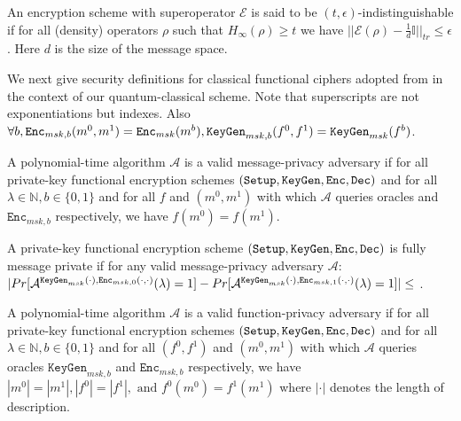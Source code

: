 \begin{definition}
\label{def:ent-ind}
An encryption scheme with superoperator $\mathcal{E}$ is said to be $(t,\epsilon)$-indistinguishable if for all (density) operators $\rho$ such that $H_\infty(\rho) \geq t$ we have 
$ \lvert\lvert \mathcal{E}(\rho) - \frac{1}{d}\mathbb{I}\rvert\rvert_{tr} \le \epsilon $. Here $d$ is the size of the message space.
\end{definition}

\noindent We next give security definitions for classical functional ciphers adopted from \cite{fesec} in the context of our quantum-classical scheme. Note that superscripts are not exponentiations but indexes. Also 
$\forall b, \texttt{Enc}_{msk,b}(m^0,m^1) = \texttt{Enc}_{msk}(m^b),\\ \texttt{KeyGen}_{msk,b}(f^0,f^1) = \texttt{KeyGen}_{msk}(f^b)$.

\begin{definition}
\label{def:vmpa}
A polynomial-time algorithm $\mathcal{A}$ is a valid message-privacy adversary if for all private-key functional encryption schemes $(\texttt{Setup},\texttt{KeyGen},\texttt{Enc},\texttt{Dec})$ and for all $\lambda \in \mathbb{N}, b \in \{ 0,1 \}$ and for all $f$ and $(m^0,m^1)$ with which $\mathcal{A}$ queries oracles \kgen and $\texttt{Enc}_{msk,b}$ respectively, we have $f(m^0) = f(m^1)$.
\end{definition}

\begin{definition}
\label{def:fmp}
A private-key functional encryption scheme $(\texttt{Setup},\texttt{KeyGen},\texttt{Enc},\texttt{Dec})$ is fully message private if for any valid message-privacy adversary $\mathcal{A}$: \\
$ \lvert Pr[  \mathcal{A}^{\texttt{KeyGen}_{msk}(\cdot),\texttt{Enc}_{msk,0}(\cdot,\cdot)}(\lambda) = 1] - Pr[ \mathcal{A}^{\texttt{KeyGen}_{msk}(\cdot),\texttt{Enc}_{msk,1}(\cdot,\cdot)}(\lambda) = 1] \rvert \\ \le $ \negl.
\end{definition}

\begin{definition}
\label{def:vfpa}
A polynomial-time algorithm $\mathcal{A}$ is a valid function-privacy adversary if for all private-key functional encryption schemes $(\texttt{Setup},\texttt{KeyGen},\texttt{Enc},\texttt{Dec})$ and for all $\lambda \in \mathbb{N}, b \in \{ 0,1 \}$ and for all $(f^0,f^1)$ and $(m^0,m^1)$ with which $\mathcal{A}$ queries oracles $\texttt{KeyGen}_{msk,b}$ and $\texttt{Enc}_{msk,b}$ respectively, we have 
$|m^0| = |m^1|, |f^0| = |f^1|, \text{ and } f^0(m^0) = f^1(m^1)$ where $|\cdot|$ denotes the length of description.
\end{definition}

